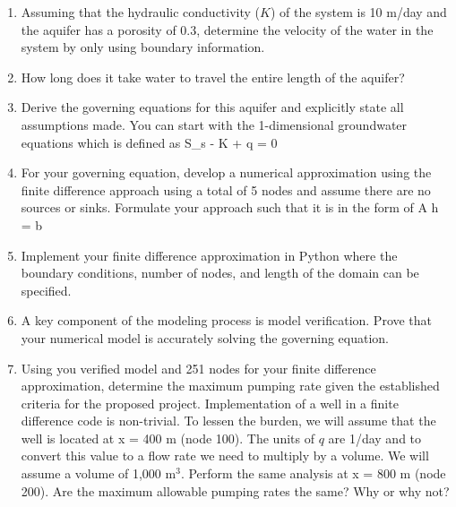 \documentclass[11pt]{report}
\begin{document}
\begin{itemize}
\begin{enumerate}[label=(\roman*)]
    \item Assuming that the hydraulic conductivity ($K$) of the system is 10 m/day and the aquifer has a porosity of 0.3, determine the velocity of the water in the system by only using boundary information. 
    \item How long does it take water to travel the entire length of the aquifer? 
    \item Derive the governing equations for this aquifer and explicitly state all assumptions made. You can start with the 1-dimensional groundwater equations which is defined as
    \beq
    S_s  -  \lp K  \rp + q = 0
    \eeq
    \item For your governing equation, develop a numerical approximation using the finite difference approach using a total of 5 nodes and assume there are no sources or sinks. Formulate your approach such that it is in the form of 
    \beq
    \ten A \vec h  = \vec b
    \eeq
    \item Implement your finite difference approximation in Python where the boundary conditions, number of nodes, and length of the domain can be specified. 
    \item A key component of the modeling process is model verification. Prove that your numerical model is accurately solving the governing equation.
    \item Using you verified model and 251 nodes for your finite difference approximation, determine the maximum pumping rate given the established criteria for the proposed project. Implementation of a well in a finite difference code is non-trivial. To lessen the burden, we will assume that the well is located at x = 400 m (node 100). The units of $q$ are 1/day and to convert this value to a flow rate we need to multiply by a volume. We will assume a volume of 1,000 m$^3$. Perform the same analysis at x = 800 m (node 200). Are the maximum allowable pumping rates the same? Why or why not? 

\end{enumerate}

\end{itemize}
\end{document}
